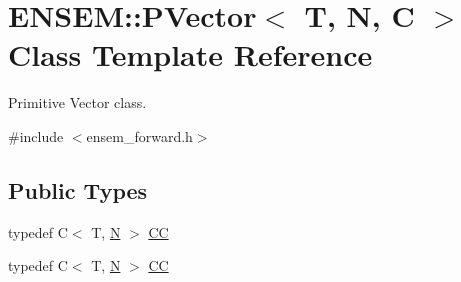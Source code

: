 \hypertarget{classENSEM_1_1PVector}{}\section{E\+N\+S\+EM\+:\+:P\+Vector$<$ T, N, C $>$ Class Template Reference}
\label{classENSEM_1_1PVector}


Primitive Vector class.  




{\ttfamily \#include $<$ensem\+\_\+forward.\+h$>$}

\subsection*{Public Types}
\begin{DoxyCompactItemize}
\item 
typedef C$<$ T, \mbox{\hyperlink{operator__name__util_8cc_a7722c8ecbb62d99aee7ce68b1752f337}{N}} $>$ \mbox{\hyperlink{classENSEM_1_1PVector_a92dc0a0a301a3dc96f7be5d337019bc7}{CC}}
\item 
typedef C$<$ T, \mbox{\hyperlink{operator__name__util_8cc_a7722c8ecbb62d99aee7ce68b1752f337}{N}} $>$ \mbox{\hyperlink{classENSEM_1_1PVector_a92dc0a0a301a3dc96f7be5d337019bc7}{CC}}
\end{DoxyCompactItemize}
